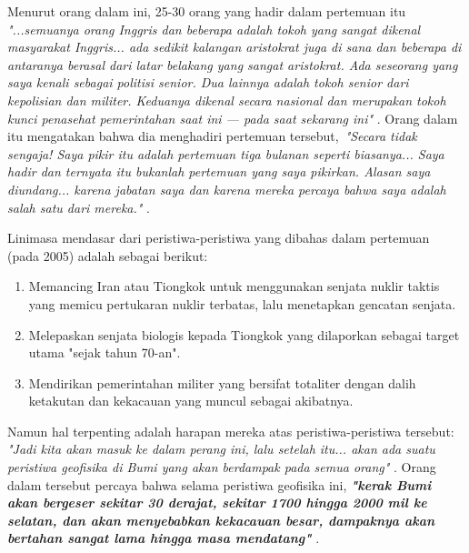 \documentclass[10pt,twocolumn,letterpaper]{article}
\begin{document}
Menurut orang dalam ini, 25-30 orang yang hadir dalam pertemuan itu \textit{"...semuanya orang Inggris dan beberapa adalah tokoh yang sangat dikenal masyarakat Inggris... ada sedikit kalangan aristokrat juga di sana dan beberapa di antaranya berasal dari latar belakang yang sangat aristokrat. Ada seseorang yang saya kenali sebagai politisi senior. Dua lainnya adalah tokoh senior dari kepolisian dan militer. Keduanya dikenal secara nasional dan merupakan tokoh kunci penasehat pemerintahan saat ini — pada saat sekarang ini"} \cite{4}. Orang dalam itu mengatakan bahwa dia menghadiri pertemuan tersebut,\ \textit{"Secara tidak sengaja! Saya pikir itu adalah pertemuan tiga bulanan seperti biasanya... Saya hadir dan ternyata itu bukanlah pertemuan yang saya pikirkan. Alasan saya diundang... karena jabatan saya dan karena mereka percaya bahwa saya adalah salah satu dari mereka."} \cite{4}.

Linimasa mendasar dari peristiwa-peristiwa yang dibahas dalam pertemuan (pada 2005) adalah sebagai berikut:
\begin{flushleft}
\begin{enumerate}
    \item Memancing Iran atau Tiongkok untuk menggunakan senjata nuklir taktis yang memicu pertukaran nuklir terbatas, lalu menetapkan gencatan senjata.
    \item Melepaskan senjata biologis kepada Tiongkok yang dilaporkan sebagai target utama "sejak tahun 70-an".
    \item Mendirikan pemerintahan militer yang bersifat totaliter dengan dalih ketakutan dan kekacauan yang muncul sebagai akibatnya.
\end{enumerate}
\end{flushleft}

Namun hal terpenting adalah harapan mereka atas peristiwa-peristiwa tersebut: \textit{"Jadi kita akan masuk ke dalam perang ini, lalu setelah itu... akan ada suatu peristiwa geofisika di Bumi yang akan berdampak pada semua orang"} \cite{4}. Orang dalam tersebut percaya bahwa selama peristiwa geofisika ini, \textit{\textbf{"kerak Bumi akan bergeser sekitar 30 derajat, sekitar 1700 hingga 2000 mil ke selatan, dan akan menyebabkan kekacauan besar, dampaknya akan bertahan sangat lama hingga masa mendatang"}} \cite{4}.
\end{document}
